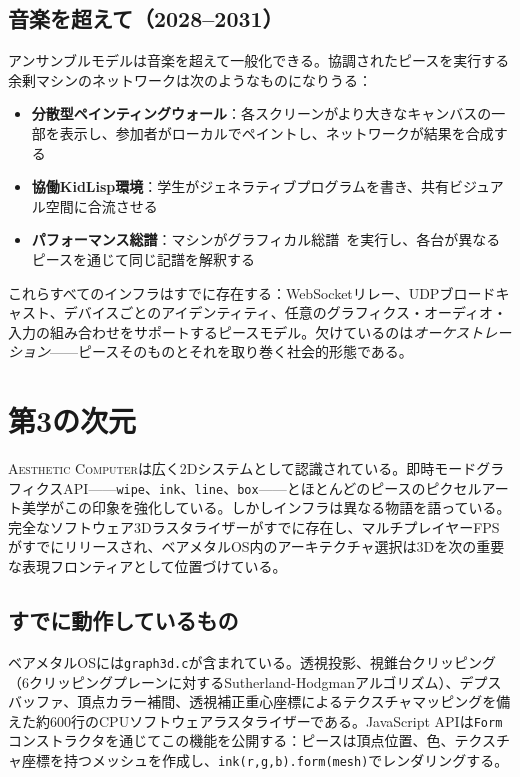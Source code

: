 \documentclass[10pt,letterpaper,twocolumn]{article}
\newcommand{\ac}{\textsc{Aesthetic Computer}}
\begin{document}
\subsection{音楽を超えて（2028--2031）}

アンサンブルモデルは音楽を超えて一般化できる。協調されたピースを実行する余剰マシンのネットワークは次のようなものになりうる：

\begin{itemize}
  \item \textbf{分散型ペインティングウォール}：各スクリーンがより大きなキャンバスの一部を表示し、参加者がローカルでペイントし、ネットワークが結果を合成する
  \item \textbf{協働KidLisp環境}：学生がジェネラティブプログラムを書き、共有ビジュアル空間に合流させる
  \item \textbf{パフォーマンス総譜}：マシンがグラフィカル総譜~\citep{scudder2026pieces}を実行し、各台が異なるピースを通じて同じ記譜を解釈する
\end{itemize}

これらすべてのインフラはすでに存在する：WebSocketリレー、UDPブロードキャスト、デバイスごとのアイデンティティ、任意のグラフィクス・オーディオ・入力の組み合わせをサポートするピースモデル。欠けているのは\emph{オーケストレーション}——ピースそのものとそれを取り巻く社会的形態である。


\section{第3の次元}
\label{sec:3d}

\ac{}は広く2Dシステムとして認識されている。即時モードグラフィクスAPI——\texttt{wipe}、\texttt{ink}、\texttt{line}、\texttt{box}——とほとんどのピースのピクセルアート美学がこの印象を強化している。しかしインフラは異なる物語を語っている。完全なソフトウェア3Dラスタライザーがすでに存在し、マルチプレイヤーFPSがすでにリリースされ、ベアメタルOS内のアーキテクチャ選択は3Dを次の重要な表現フロンティアとして位置づけている。

\subsection{すでに動作しているもの}

ベアメタルOSには\texttt{graph3d.c}が含まれている。透視投影、視錐台クリッピング（6クリッピングプレーンに対するSutherland-Hodgmanアルゴリズム）、デプスバッファ、頂点カラー補間、透視補正重心座標によるテクスチャマッピングを備えた約600行のCPUソフトウェアラスタライザーである。JavaScript APIは\texttt{Form}コンストラクタを通じてこの機能を公開する：ピースは頂点位置、色、テクスチャ座標を持つメッシュを作成し、\texttt{ink(r,g,b).form(mesh)}でレンダリングする。
\end{document}
